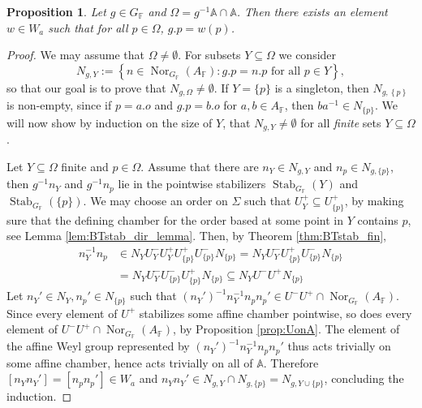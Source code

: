 \documentclass[12pt]{amsart}
\newcommand{\F}{\mathbb{F} }
\newcommand{\A}{\mathbb{A}}
\numberwithin{equation}{section}
\newtheorem{proposition}[theorem]{Proposition}
\theoremstyle{remark} %
\begin{document}
		\begin{proposition}\label{prop:A2_b}
			Let $g\in G_\F$ and $\Omega = g^{-1}\A \cap \A$. Then there exists an element $w\in W_a$ such that for all $p \in \Omega$, $g.p = w(p)$.
		\end{proposition}
		\begin{proof}
			We may assume that $\Omega \neq \emptyset$. For subsets $Y \subseteq \Omega$ we consider
			$$
			N_{g,Y} := \left\{ n \in \operatorname{Nor}_{G_\F}(A_\F) \colon  g.p = n.p \text{ for all } p\in Y \right\},
			$$
			so that our goal is to prove that $N_{g,\Omega} \neq \emptyset$.
			If $Y=\{p\}$ is a singleton, then $N_{g,\left\{p\right\}}$ is non-empty, since if $p=a.o$ and $g.p = b.o$ for $a,b\in A_\F$, then $ba^{-1} \in N_{\{p\}}$. We will now show by induction on the size of $Y$, that $N_{g,Y} \neq \emptyset$ for all \emph{finite} sets $Y \subseteq \Omega$.
			
			Let $Y\subseteq \Omega$ finite and $p \in \Omega$. Assume that there are $n_{Y} \in N_{g,Y}$ and $n_p \in N_{g,\{p\}} $, then $g^{-1}n_Y$ and $g^{-1}n_p $ lie in the pointwise stabilizers $\operatorname{Stab}_{G_\F}(Y)$ and $ \operatorname{Stab}_{G_\F}(\{p\})$. We may choose an order on $\Sigma$ such that $U_{Y}^+ \subseteq U_{\{p\}}^+$, by making sure that the defining chamber for the	order based at some point in $Y$ contains $p$, see Lemma \ref{lem:BTstab_dir_lemma}.
			Then, by Theorem \ref{thm:BTstab_fin},
			\begin{align*}
				n_Y^{-1} n_p &\in N_Y U_Y^- U_Y^+ U_{\{p\}}^+ U_{\{p\}}^- N_{\{p\}} 
				=  N_Y U_{Y}^- U_{\{p\}}^+ U_{\{p\}}^- N_{\{p\}}\\
				&=  N_Y U_{Y}^- U_{\{p\}}^- U_{\{p\}}^+ N_{\{p\}}
				\subseteq N_Y U^- U^+ N_{\{p\}}
			\end{align*}
			Let $n_Y' \in N_Y, n_p' \in N_{\{p\}}$ such that $(n_Y')^{-1}n_Y^{-1}n_pn_p' \in U^{-} U^{+} \cap \operatorname{Nor}_{G_\F}(A_\F)$. %
			Since every element of $U^+$ stabilizes some affine chamber pointwise, so does every element of $U^-U^+ \cap \operatorname{Nor}_{G_\F}(A_\F)$, by Proposition \ref{prop:UonA}. The element of the affine Weyl group represented by $(n_Y')^{-1}n_Y^{-1}n_pn_p'$ thus acts trivially on some affine chamber, hence acts trivially on all of $\A$. 
			Therefore $[n_Yn_Y'] = [n_pn_p'] \in W_a$ and $ n_Y n_Y' \in N_{g,Y} \cap N_{g,\{p\}} = N_{g,Y\cup \{p\}}$, concluding the induction.
			

\end{proof}
\end{document}
